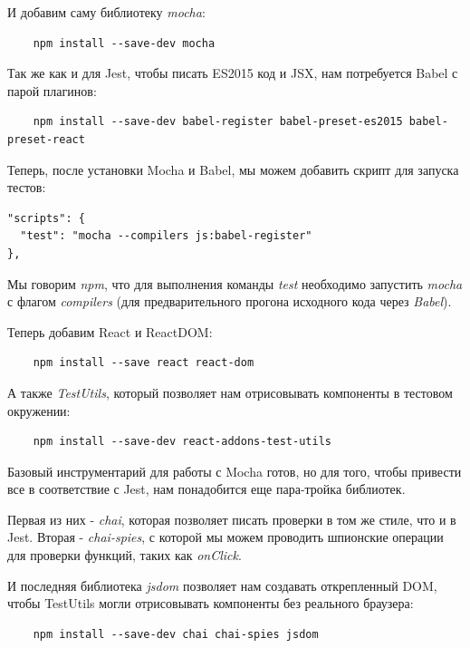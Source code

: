 И добавим саму библиотеку \textit{mocha}:

\begin{lstlisting}
	npm install --save-dev mocha
\end{lstlisting}

Так же как и для Jest, чтобы писать ES2015 код и JSX, нам потребуется Babel с парой плагинов:

\begin{lstlisting}
	npm install --save-dev babel-register babel-preset-es2015 babel-preset-react
\end{lstlisting}

Теперь, после установки Mocha и Babel, мы можем добавить скрипт для запуска тестов:

\begin{lstlisting}
"scripts": {
  "test": "mocha --compilers js:babel-register"
},	
\end{lstlisting}

Мы говорим \textit{npm}, что для выполнения команды \textit{test} необходимо запустить \textit{mocha} с флагом \textit{compilers} (для предварительного прогона исходного кода через \textit{Babel}).

Теперь добавим React и ReactDOM:

\begin{lstlisting}
	npm install --save react react-dom
\end{lstlisting}

А также \textit{TestUtils}, который позволяет нам отрисовывать компоненты в тестовом окружении:

\begin{lstlisting}
	npm install --save-dev react-addons-test-utils
\end{lstlisting}

Базовый инструментарий для работы с Mocha готов, но для того, чтобы привести все в соответствие с Jest, нам понадобится еще пара-тройка библиотек.

Первая из них - \textit{chai}, которая позволяет писать проверки в том же стиле, что и в Jest. Вторая - \textit{chai-spies}, с которой мы можем проводить шпионские операции для проверки функций, таких как \textit{onClick}. 

И последняя библиотека \textit{jsdom} позволяет нам создавать открепленный DOM, чтобы TestUtils могли отрисовывать компоненты без реального браузера:

\begin{lstlisting}
	npm install --save-dev chai chai-spies jsdom
\end{lstlisting}

